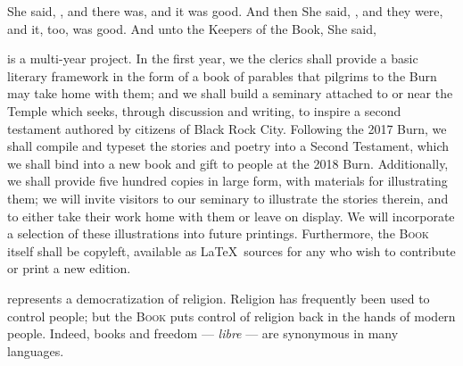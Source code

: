 
\chs {} She said,
, and there was, and it was good.
\vv And then She said, \footnotemarkmain{}, and they were, and it, too, was good.
\vv And unto the Keepers of the Book, She said, \footnotemarkmain{} \vv{}

 is a multi-year project.
\vv \footnotemarkmain{}In the first year, we the clerics shall provide a basic literary framework in the form of a book of parables that pilgrims to the Burn may take home with them; \vv and we shall build a seminary attached to or near the Temple which seeks, through discussion and writing, to inspire a second testament authored by citizens of Black Rock City.
\vv Following the 2017 Burn, we shall compile and typeset the stories and poetry into a Second Testament, which we shall bind into a new book and gift to people at the 2018 Burn.
\vv Additionally, we shall provide five hundred copies in large form, with materials for illustrating them; \vv we will invite visitors to our seminary to illustrate the stories therein, and to either take their work home with them or leave on display.
\vv We will incorporate a selection of these illustrations into future printings.
\vv Furthermore, the \textsc{Book} itself shall be copyleft, available as \LaTeX\ sources for any who wish to contribute or print a new edition.


 represents a democratization of religion.\footnotemarkmain{}
\vv Religion has frequently been used to control people; but the \textsc{Book} puts control of religion back in the hands of modern people.
\vv Indeed, books and freedom --- \textit{libre} --- are synonymous in many languages.


